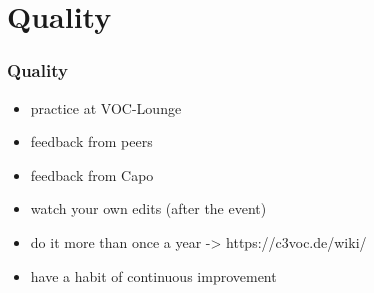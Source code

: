 \documentclass[hyperref={pdfpagelabels=false}]{beamer}
\begin{document}
\begin{frame}
\end{frame}

\section{Quality} 
\begin{frame}
\frametitle{Quality}
\begin{itemize}[<+->]
\item  practice at VOC-Lounge %
\item  feedback from peers %
\item  feedback from Capo %
\item  watch your own edits (after the event) %
\item  do it more than once a year -> https://c3voc.de/wiki/ %
\item  have a habit of continuous improvement %
\end{itemize} 
\end{frame}
\end{document}
